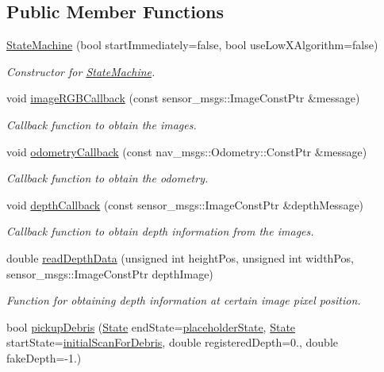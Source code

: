 \subsection*{Public Member Functions}
\begin{DoxyCompactItemize}
\item 
\hyperlink{classStateMachine_a6e640066c98dd3acd70e63d8a2c2282b}{State\+Machine} (bool start\+Immediately=false, bool use\+Low\+X\+Algorithm=false)
\begin{DoxyCompactList}\small\item\em Constructor for \hyperlink{classStateMachine}{State\+Machine}. \end{DoxyCompactList}\item 
void \hyperlink{classStateMachine_aab9afe1c41b8c88e9fe2e2c4be227bfb}{image\+R\+G\+B\+Callback} (const sensor\+\_\+msgs\+::\+Image\+Const\+Ptr \&message)
\begin{DoxyCompactList}\small\item\em Callback function to obtain the images. \end{DoxyCompactList}\item 
void \hyperlink{classStateMachine_a64cd46adabf0963ea057535ab8bba849}{odometry\+Callback} (const nav\+\_\+msgs\+::\+Odometry\+::\+Const\+Ptr \&message)
\begin{DoxyCompactList}\small\item\em Callback function to obtain the odometry. \end{DoxyCompactList}\item 
void \hyperlink{classStateMachine_a1502417471ac1ab34c2e9e3a34bf8f4c}{depth\+Callback} (const sensor\+\_\+msgs\+::\+Image\+Const\+Ptr \&depth\+Message)
\begin{DoxyCompactList}\small\item\em Callback function to obtain depth information from the images. \end{DoxyCompactList}\item 
double \hyperlink{classStateMachine_ae70aff20d71caa15c22b5ae5de8f76af}{read\+Depth\+Data} (unsigned int height\+Pos, unsigned int width\+Pos, sensor\+\_\+msgs\+::\+Image\+Const\+Ptr depth\+Image)
\begin{DoxyCompactList}\small\item\em Function for obtaining depth information at certain image pixel position. \end{DoxyCompactList}\item 
bool \hyperlink{classStateMachine_a68b85b66b901ee8fbd9c7be93487f28f}{pickup\+Debris} (\hyperlink{classStateMachine_a08a90356de9073dd0ee4d56b74d2e823}{State} end\+State=\hyperlink{classStateMachine_a08a90356de9073dd0ee4d56b74d2e823a016d5abef569ab6b71056250fe22521d}{placeholder\+State}, \hyperlink{classStateMachine_a08a90356de9073dd0ee4d56b74d2e823}{State} start\+State=\hyperlink{classStateMachine_a08a90356de9073dd0ee4d56b74d2e823aab795cc7ada954f7046748f8e88917a8}{initial\+Scan\+For\+Debris}, double registered\+Depth=0., double fake\+Depth=-\/1.)

\end{DoxyCompactItemize}
